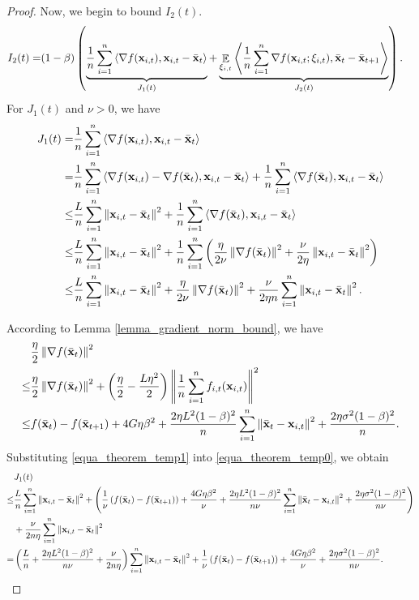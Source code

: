 \documentclass{article}
\begin{document}
\begin{proof}
Now, we begin to bound $I_2(t)$.
\begin{align}
\nonumber
I_2(t) = & (1-\beta) \left( \underbrace{ \frac{1}{n}\sum_{i=1}^n\left\langle\nabla f({\bf x}_{i,t}), {\bf x}_{i,t} - \bar{{\bf x}}_t  \right\rangle }_{J_1(t)} +  \underbrace{ \mathop{\mathbb{E}}_{\xi_{i,t}}\left\langle\frac{1}{n}\sum_{i=1}^n \nabla f({\bf x}_{i,t};\xi_{i,t}), \bar{{\bf x}}_t - \bar{{\bf x}}_{t+1}  \right\rangle}_{J_2(t)} \right).
\end{align} For $J_1(t)$ and $\nu>0$, we have
\begin{align}
\nonumber
J_1(t) = & \frac{1}{n}\sum_{i=1}^n\left\langle\nabla f({\bf x}_{i,t}), {\bf x}_{i,t} - \bar{{\bf x}}_t  \right\rangle \\ \nonumber
= & \frac{1}{n}\sum_{i=1}^n\left\langle\nabla f({\bf x}_{i,t}) - \nabla f(\bar{{\bf x}}_t), {\bf x}_{i,t} - \bar{{\bf x}}_t  \right\rangle + \frac{1}{n}\sum_{i=1}^n\left\langle\nabla f(\bar{{\bf x}}_t), {\bf x}_{i,t} - \bar{{\bf x}}_t  \right\rangle \\ \nonumber
\le & \frac{L}{n}\sum_{i=1}^n \left\lVert{\bf x}_{i,t} - \bar{{\bf x}}_t\right\rVert^2 + \frac{1}{n}\sum_{i=1}^n\left\langle\nabla f(\bar{{\bf x}}_t), {\bf x}_{i,t} - \bar{{\bf x}}_t  \right\rangle \\ \nonumber
\le & \frac{L}{n}\sum_{i=1}^n \left\lVert{\bf x}_{i,t} - \bar{{\bf x}}_t\right\rVert^2 + \frac{1}{n}\sum_{i=1}^n\left( \frac{\eta}{2\nu}\left\lVert\nabla f(\bar{{\bf x}}_t)\right\rVert^2 + \frac{\nu}{2\eta}\left\lVert{\bf x}_{i,t} - \bar{{\bf x}}_t \right\rVert^2  \right) \\ \label{equa_theorem_temp0}
\le & \frac{L}{n}\sum_{i=1}^n \left\lVert{\bf x}_{i,t} - \bar{{\bf x}}_t\right\rVert^2 + \frac{\eta}{2\nu}\left\lVert\nabla f(\bar{{\bf x}}_t)\right\rVert^2 + \frac{\nu}{2\eta n}\sum_{i=1}^n\left\lVert{\bf x}_{i,t} - \bar{{\bf x}}_t \right\rVert^2. 
\end{align}

According to Lemma \ref{lemma_gradient_norm_bound}, we have
\begin{align}
\nonumber
& \frac{\eta}{2}\left\lVert\nabla f(\bar{{\bf x}}_t)\right\rVert^2  \\ \nonumber
\le & \frac{\eta}{2}\left\lVert\nabla f(\bar{{\bf x}}_t)\right\rVert^2 + \left( \frac{\eta}{2} - \frac{L\eta^2}{2} \right)\left\lVert\frac{1}{n}\sum_{i=1}^n f_{i,t}({\bf x}_{i,t})\right\rVert^2 \\ \label{equa_theorem_temp1}
\le & f(\bar{{\bf x}}_t) - f(\bar{{\bf x}}_{t+1}) + 4G\eta\beta^2 +  \frac{2\eta L^2(1-\beta)^2}{n}\sum_{i=1}^n\left\lVert\bar{{\bf x}}_t - {\bf x}_{i,t} \right\rVert^2 + \frac{2\eta \sigma^2 (1-\beta)^2}{n}.
\end{align} Substituting \eqref{equa_theorem_temp1} into \eqref{equa_theorem_temp0}, we obtain
\begin{align}
\nonumber
& J_1(t) \\ \nonumber 
\le & \frac{L}{n}\sum_{i=1}^n \left\lVert{\bf x}_{i,t} - \bar{{\bf x}}_t\right\rVert^2 + \left(  \frac{1}{\nu}\left( f(\bar{{\bf x}}_t) - f(\bar{{\bf x}}_{t+1}) \right) + \frac{4G\eta\beta^2}{\nu} +  \frac{2\eta L^2(1-\beta)^2}{n\nu}\sum_{i=1}^n\left\lVert\bar{{\bf x}}_t - {\bf x}_{i,t} \right\rVert^2 + \frac{2\eta \sigma^2 (1-\beta)^2}{n\nu}  \right)\\ \nonumber 
& + \frac{\nu}{2n\eta}\sum_{i=1}^n\left\lVert{\bf x}_{i,t} - \bar{{\bf x}}_t \right\rVert^2  \\ \nonumber
= & \left(  \frac{L}{n} + \frac{2\eta L^2(1-\beta)^2}{n\nu} + \frac{\nu}{2n\eta}  \right)\sum_{i=1}^n\left\lVert{\bf x}_{i,t} - \bar{{\bf x}}_t \right\rVert^2 + \frac{1}{\nu}\left( f(\bar{{\bf x}}_t) - f(\bar{{\bf x}}_{t+1}) \right) + \frac{4G\eta\beta^2}{\nu} + \frac{2\eta \sigma^2 (1-\beta)^2}{n\nu}.
\end{align}


\end{proof}
\end{document}
